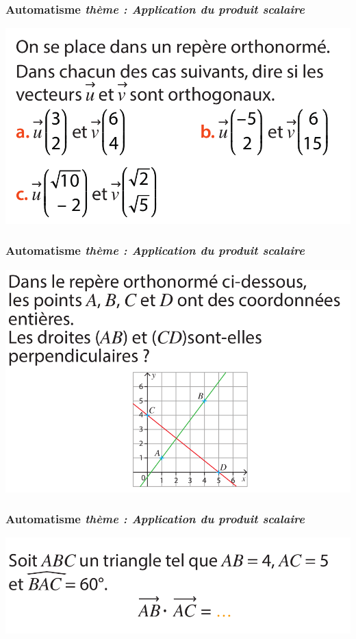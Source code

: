 \documentclass[11pt]{beamer}
\newcounter{autocompteur}
\newcommand{\automatisme}[1]{\addtocounter{autocompteur}{1}\frametitle{Automatisme  \theautocompteur  \textit{ thème : #1}}}
\begin{document}
\label{prodscalaire}

\begin{frame}
\automatisme{Application du produit scalaire}

\begin{center}
\includegraphics[scale=0.3]{ressources/prodscal-1.png}
\end{center}


\end{frame}


\begin{frame}
\automatisme{Application du produit scalaire}

\begin{center}
\includegraphics[scale=0.3]{ressources/prodscal-2.png}
\end{center}


\end{frame}


\begin{frame}
\automatisme{Application du produit scalaire}

\begin{center}
\includegraphics[scale=0.3]{ressources/prodscal-3.png}
\end{center}


\end{frame}
\end{document}
